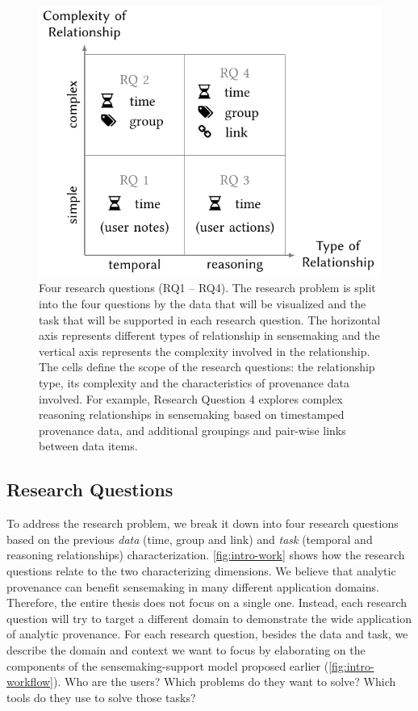 \begin{figure}
	\centering
	\includegraphics[width=.8\linewidth]{work}
	\caption[Four research questions]{Four research questions (RQ1 -- RQ4). The research problem is split into the four questions by the data that will be visualized and the task that will be supported in each research question. The horizontal axis represents different types of relationship in sensemaking and the vertical axis represents the complexity involved in the relationship. The cells define the scope of the research questions: the relationship type, its complexity and the characteristics of provenance data involved. For example, Research Question 4 explores complex reasoning relationships in sensemaking based on timestamped provenance data, and additional groupings and pair-wise links between data items.}
	\label{fig:intro-work}
\end{figure}

\subsection{Research Questions}
\label{intro:questions}
To address the research problem, we break it down into four research questions based on the previous \emph{data} (time, group and link) and \emph{task} (temporal and reasoning relationships) characterization. \autoref{fig:intro-work} shows how the research questions relate to the two characterizing dimensions. We believe that analytic provenance can benefit sensemaking in many different application domains. Therefore, the entire thesis does not focus on a single one. Instead, each research question will try to target a different domain to demonstrate the wide application of analytic provenance. For each research question, besides the data and task, we describe the domain and context we want to focus by elaborating on the components of the sensemaking-support model proposed earlier (\autoref{fig:intro-workflow}). Who are the users? Which problems do they want to solve? Which tools do they use to solve those tasks?

